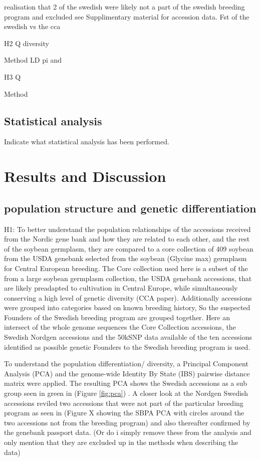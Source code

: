 \documentclass[9pt, onecolumn,twoside]{gsajnl}
\begin{document}
realisation that 2 of the swedish were likely not a part of the swedish breeding program and excluded 
see Supplimentary material for accession data. 
Fst of the swedish vs the cca

H2 
Q diversity 

Method
LD
pi and 

H3
Q 

Method


\subsection{Statistical analysis}

Indicate what statistical analysis has been performed.


\section{Results and Discussion}
\subsection{population structure and genetic differentiation} 

H1: 
To better understand the population relationships of the accessions received from the Nordic gene bank and how they are related to each other, and the rest of the soybean germplasm, they are compared to a core collection of 409 soybean from the USDA genebank selected from the soybean (Glycine max) germplasm for Central European breeding.  The Core collection used here is a subset of the from a large soybean germplasm collection, the  USDA genebank accessions, that are likely preadapted to cultivation in Central Europe, while simultaneously conserving a high level of genetic diversity (CCA paper). Additionally accessions were grouped into categories based on known breeding history, So the suspected Founders of the Swedish breeding program are grouped together. Here an intersect of the whole genome sequences the Core Collection accessions, the Swedish Nordgen accessions and the 50kSNP data available of the ten accessions identified as possible genetic Founders to the Swedish breeding program is used. 

To understand the population differentiation/ diversity, a Principal Component Analysis (PCA) and the genome-wide Identity By State (IBS) pairwise distance matrix were applied. The resulting PCA shows the Swedish accessions as a sub group seen in green in (Figure \ref{fig:pca}) . A closer look at the Nordgen Swedish accessions reviled two accessions that were not part of the particular breeding program as seen in (Figure X showing the SBPA PCA with circles around the two accessions not from the breeding program)  and also thereafter confirmed by the genebank passport data. (Or do i simply remove these from the analysis and only mention that they are excluded up in the methods when describing the data)    
\end{document}
